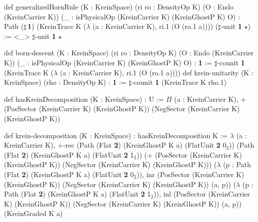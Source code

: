 \documentclass{article}
\begin{document}
def generalizedBornRule (K : KreinSpace)
\hspace*{3em}(ri ro : DensityOp K) (O : Endo (KreinCarrier K))
\hspace*{3em}(\_ : isPhysicalOp (KreinCarrier K) (KreinGhostP K) O)
\hspace*{2em}: Path ($\sharp$\,\textbf{1})
\hspace*{4em}(KreinTrace K ($\lambda$ (a : KreinCarrier K), ri.1 (O (ro.1 a))))
\hspace*{4em}($\sharp$-unit \textbf{1} $\star$)
\hspace*{1.5em}:= <\_> $\sharp$-unit \textbf{1} $\star$

def born-descent (K : KreinSpace) (ri ro : DensityOp K)
\hspace*{3em}(O : Endo (KreinCarrier K))
\hspace*{3em}(\_ : isPhysicalOp (KreinCarrier K) (KreinGhostP K) O) : \textbf{1}
\hspace*{1.5em}:= $\sharp$-counit \textbf{1} (KreinTrace K ($\lambda$ (a : KreinCarrier K), ri.1 (O (ro.1 a))))
def krein-unitarity (K : KreinSpace) (rho : DensityOp K) : \textbf{1}
\hspace*{1.5em}:= $\sharp$-counit \textbf{1} (KreinTrace K rho.1)

def hasKreinDecomposition (K : KreinSpace) : U
\hspace*{1.5em}:= $\Pi$ (a : KreinCarrier K),
\hspace*{3.5em}+ (PosSector (KreinCarrier K) (KreinGhostP K))
\hspace*{4.5em}(NegSector (KreinCarrier K) (KreinGhostP K))

def krein-decomposition (K : KreinSpace) : hasKreinDecomposition K
\hspace*{1.5em}:= $\lambda$ (a : KreinCarrier K),
\hspace*{2.5em}+-rec (Path (Flat \textbf{2}) (KreinGhostP K a) (FlatUnit \textbf{2} 0$_2$))
\hspace*{6em}(Path (Flat \textbf{2}) (KreinGhostP K a) (FlatUnit \textbf{2} 1$_2$))
\hspace*{6em}(+ (PosSector (KreinCarrier K) (KreinGhostP K))
\hspace*{7.5em}(NegSector (KreinCarrier K) (KreinGhostP K)))
\hspace*{6em}($\lambda$ (p : Path (Flat \textbf{2}) (KreinGhostP K a) (FlatUnit \textbf{2} 0$_2$)),
\hspace*{7.5em}inr (PosSector (KreinCarrier K) (KreinGhostP K))
\hspace*{9em}(NegSector (KreinCarrier K) (KreinGhostP K)) (a, p))
\hspace*{6em}($\lambda$ (p : Path (Flat \textbf{2}) (KreinGhostP K a) (FlatUnit \textbf{2} 1$_2$)),
\hspace*{7.5em}inl (PosSector (KreinCarrier K) (KreinGhostP K))
\hspace*{9em}(NegSector (KreinCarrier K) (KreinGhostP K)) (a, p))
\hspace*{6em}(KreinGraded K a)
\end{document}

